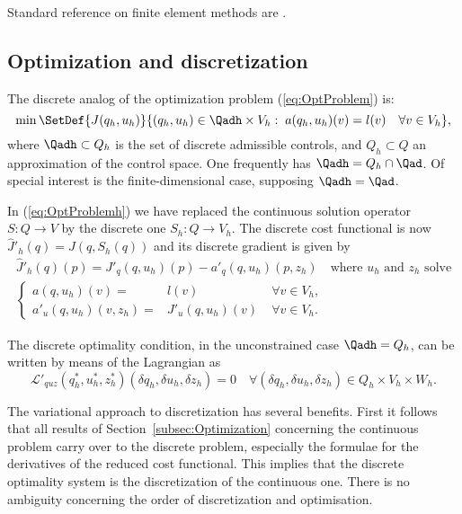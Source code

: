 Standard reference on finite element methods are \cite{Braess13}\cite{BrennerScott08}\cite{ErnGuermond04}.
%
\subsection{Optimization and discretization}\label{subsec:OptimizationAndDiscretization}
%
The discrete analog of the optimization problem (\ref{eq:OptProblem}) is: 
%
\begin{equation}\label{eq:OptProblemh}
\min\SetDef{J(q_h,u_h) }{  (q_h,u_h)\in \Qadh\times V_h:\; a(q_h,u_h)(v) = l(v)\quad\forall v\in V_h},
\end{equation}
%
where $\Qadh \subset Q_h$ is the set of discrete admissible controls, and $Q_h\subset Q$ an approximation of the control space. One frequently has $\Qadh = Q_h \cap \Qad$. 
Of special interest is the finite-dimensional case, supposing $\Qadh=\Qad$.


In (\ref{eq:OptProblemh}) we have replaced the continuous solution operator $S:Q\to V$ by the discrete one $S_h:Q\to V_h$. The discrete cost functional is now $\hat J'_h(q) = J(q, S_h(q))$ and its discrete gradient is given by
%
\begin{equation}\label{eq:GradReducedCost}
\begin{split}
\hat J'_h(q)(p) = J'_q(q,u_h)(p) - a'_q(q,u_h)(p,z_h)\quad \mbox{where $u_h$ and $z_h$ solve}\\
%
\left\{
\begin{aligned}
a(q,u_h)(v)=&l(v)\;&\forall v\in V_h,\\
a'_u(q,u_h)(v,z_h)=&J'_u(q,u_h)(v)\;&\forall v\in V_h.
\end{aligned}
\right.
%
\end{split}
\end{equation}
%


The discrete optimality 
condition, in the unconstrained case $\Qadh=Q_h$, can be written by means of the Lagrangian as
%
\begin{equation}\label{eq:DiscreteOSLagrange}
\mathcal L'_{quz}(q^*_h, u^*_h,z^*_h)(\delta q_h, \delta u_h,\delta z_h)=0\quad \forall (\delta q_h, \delta u_h,\delta z_h)\in Q_h\times V_h\times W_h.
\end{equation}
%

The variational approach to discretization has several benefits. First it follows that all results of  Section~\ref{subsec:Optimization} concerning the continuous problem carry over to the discrete problem, especially the formulae for the derivatives of the reduced cost functional. This implies that the discrete optimality system is the discretization of the continuous one. There is no ambiguity concerning the order of discretization and optimisation.

